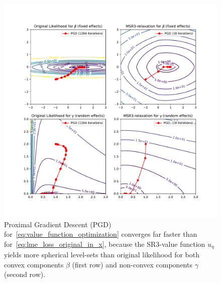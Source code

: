 



\begin{figure}[h!]
    \centering
    \includegraphics[width=\textwidth]{figures/intuition_current.pdf}
    \caption{Proximal Gradient Descent (PGD) for~\eqref{eq:value_function_optimization} converges far faster than for~\eqref{eq:lme_loss_original_in_x}, because the SR3-value function $u_\eta$ yields more spherical level-sets than original likelihood for both convex components $\beta$ (first row) and non-convex components $\gamma$ (second row). 
    }
    \label{fig:geometric_intuition_sr3}
\end{figure}

